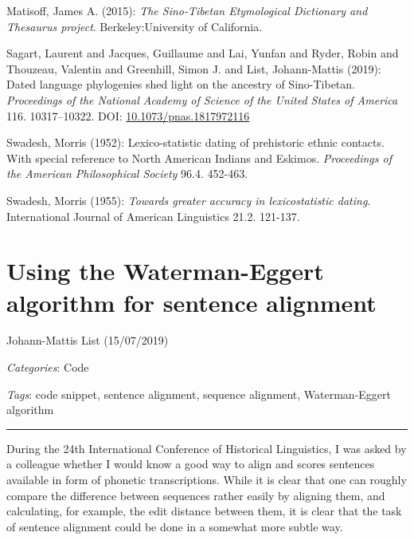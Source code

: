 \documentclass[
  a4paper,
  14pt,
  oneside,
  tablecaptionabove
]{scrbook}
\begin{document}
\nopagebreak\hangindent=0.7cm {\small  Matisoff, James A. (2015): \emph{The Sino-Tibetan Etymological Dictionary
and Thesaurus project}. Berkeley:University of California.}

\nopagebreak\hangindent=0.7cm {\small  Sagart, Laurent and Jacques, Guillaume and Lai, Yunfan and Ryder,
Robin and Thouzeau, Valentin and Greenhill, Simon J. and List,
Johann-Mattis (2019): Dated language phylogenies shed light on the
ancestry of Sino-Tibetan. \emph{Proceedings of the National Academy of Science
of the United States of America} 116. 10317--10322. DOI:
\href{https://doi.org/10.1073/pnas.1817972116}{10.1073/pnas.1817972116} }

\nopagebreak\hangindent=0.7cm {\small  Swadesh, Morris (1952): Lexico-statistic dating of prehistoric
ethnic contacts. With special reference to North American Indians and
Eskimos. \emph{Proceedings of the American Philosophical Society} 96.4.
452-463.}

\nopagebreak\hangindent=0.7cm {\small  Swadesh, Morris (1955): \emph{Towards greater accuracy in lexicostatistic
dating}. International Journal of American Linguistics 21.2. 121-137.}






\newpage
\section*{Using the Waterman-Eggert algorithm for sentence alignment}

Johann-Mattis List (15/07/2019)

\emph{Categories}: Code

\emph{Tags}: code snippet, sentence alignment, sequence alignment,
Waterman-Eggert algorithm

\begin{center}\rule{0.5\linewidth}{1pt}\end{center}

During the 24th International Conference of Historical Linguistics, I
was asked by a colleague whether I would know a good way to align and
scores sentences available in form of phonetic transcriptions. While it
is clear that one can roughly compare the difference between sequences
rather easily by aligning them, and calculating, for example, the edit
distance between them, it is clear that the task of sentence alignment
could be done in a somewhat more subtle way.
\end{document}
